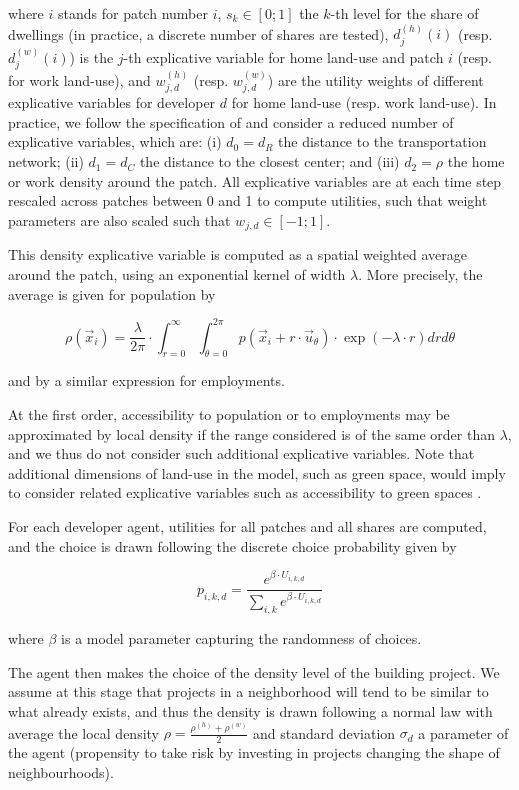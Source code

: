 \documentclass[letterpaper]{article}
\begin{document}
where $i$ stands for patch number $i$, $s_k \in \left[0 ; 1\right]$ the $k$-th level for the share of dwellings (in practice, a discrete number of shares are tested), $d_j^{(h)}(i)$ (resp. $d_j^{(w)}(i)$) is the $j$-th explicative variable for home land-use and patch $i$ (resp. for work land-use), and $w_{j,d}^{(h)}$ (resp. $w_{j,d}^{(w)}$) are the utility weights of different explicative variables for developer $d$ for home land-use (resp. work land-use). In practice, we follow the specification of \cite{raimbault2014hybrid} and consider a reduced number of explicative variables, which are: (i) $d_0 = d_R$ the distance to the transportation network; (ii) $d_1 = d_C$ the distance to the closest center; and (iii) $d_2 = \rho$ the home or work density around the patch. All explicative variables are at each time step rescaled across patches between 0 and 1 to compute utilities, such that weight parameters are also scaled such that $w_{j,d} \in \left[-1 ; 1\right]$.

This density explicative variable is computed as a spatial weighted average around the patch, using an exponential kernel of width $\lambda$. More precisely, the average is given for population by

\[
\rho (\vec{x}_i) = \frac{\lambda}{2\pi} \cdot \int_{r=0}^{\infty} \int_{\theta=0}^{2\pi} p(\vec{x}_i + r\cdot \vec{u}_{\theta}) \cdot \exp\left(- \lambda \cdot r\right) dr d\theta
\]

and by a similar expression for employments.

At the first order, accessibility to population or to employments \citep{levinson2020towards} may be approximated by local density if the range considered is of the same order than $\lambda$, and we thus do not consider such additional explicative variables. Note that additional dimensions of land-use in the model, such as green space, would imply to consider related explicative variables such as accessibility to green spaces \citep{higgs2012investigating}.

For each developer agent, utilities for all patches and all shares are computed, and the choice is drawn following the discrete choice probability given by

\[
p_{i,k,d} = \frac{e^{\beta \cdot U_{i,k,d}}}{\sum_{i,k} e^{\beta \cdot U_{i,k,d}}}
\]

where $\beta$ is a model parameter capturing the randomness of choices.

The agent then makes the choice of the density level of the building project. We assume at this stage that projects in a neighborhood will tend to be similar to what already exists, and thus the density is drawn following a normal law with average the local density $\rho = \frac{\rho^{(h)} + \rho^{(w)}}{2}$ and standard deviation $\sigma_d$ a parameter of the agent (propensity to take risk by investing in projects changing the shape of neighbourhoods).
\end{document}
